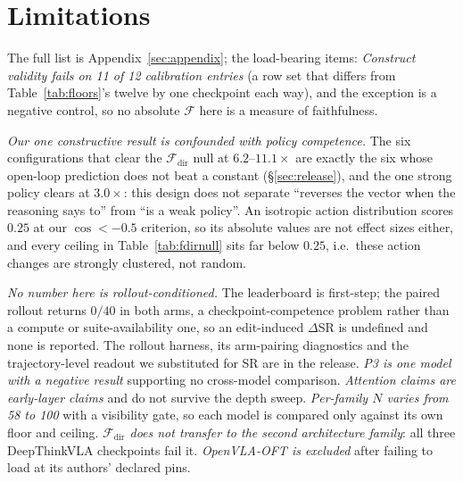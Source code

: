\documentclass[11pt]{article}
\begin{document}
\clearpage
\section*{Limitations}

The full list is Appendix~\ref{sec:appendix}; the load-bearing items: \emph{Construct validity fails on 11 of 12 calibration entries} (a row set that differs from Table~\ref{tab:floors}'s twelve by one checkpoint each way), and the exception is a negative control, so no absolute $\mathcal{F}$ here is a measure of faithfulness.

\emph{Our one constructive result is confounded with policy competence.} The six configurations that clear the $\mathcal{F}_{\text{dir}}$ null at $6.2$--$11.1\times$ are exactly the six whose open-loop prediction does not beat a constant (\S\ref{sec:release}), and the one strong policy clears at $3.0\times$: this design does not separate ``reverses the vector when the reasoning says to'' from ``is a weak policy''. An isotropic action distribution scores $0.25$ at our $\cos < -0.5$ criterion, so its absolute values are not effect sizes either, and every ceiling in Table~\ref{tab:fdirnull} sits far below $0.25$, i.e.\ these action changes are strongly clustered, not random.

\emph{No number here is rollout-conditioned.} The leaderboard is first-step; the paired rollout returns $0/40$ in both arms, a checkpoint-competence problem rather than a compute or suite-availability one, so an edit-induced $\Delta$SR is undefined and none is reported. The rollout harness, its arm-pairing diagnostics and the trajectory-level readout we substituted for SR are in the release. \emph{P3 is one model with a negative result} supporting no cross-model comparison. \emph{Attention claims are early-layer claims} and do not survive the depth sweep. \emph{Per-family $N$ varies from 58 to 100} with a visibility gate, so each model is compared only against its own floor and ceiling. \emph{$\mathcal{F}_{\text{dir}}$ does not transfer to the second architecture family}: all three DeepThinkVLA checkpoints fail it. \emph{OpenVLA-OFT \citep{openvlaoft} is excluded} after failing to load at its authors' declared pins.
\end{document}
